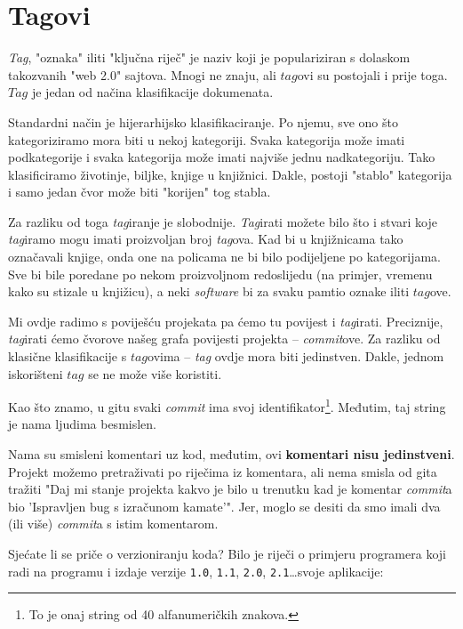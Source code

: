 \chapter*{Tagovi}

\emph{Tag}, "oznaka" iliti "ključna riječ" je naziv koji je populariziran s dolaskom takozvanih "web 2.0" sajtova. 
Mnogi ne znaju, ali $tag$ovi su postojali i prije toga. 
$Tag$ je jedan od načina klasifikacije dokumenata.

Standardni način je hijerarhijsko klasifikaciranje.
Po njemu, sve ono što kategoriziramo mora biti u nekoj kategoriji.
Svaka kategorija može imati podkategorije i svaka kategorija može imati najviše jednu nadkategoriju.
Tako klasificiramo životinje, biljke, knjige u knjižnici.
Dakle, postoji "stablo" kategorija i samo jedan čvor može biti "korijen" tog stabla.

Za razliku od toga \emph{tag}iranje je slobodnije.
\emph{Tag}irati možete bilo što i stvari koje \emph{tag}iramo mogu imati proizvoljan broj \emph{tag}ova.
Kad bi u knjižnicama tako označavali knjige, onda one na policama ne bi bilo podijeljene po kategorijama.
Sve bi bile poredane po nekom proizvoljnom redoslijedu (na primjer, vremenu kako su stizale u knjižicu), a neki \emph{software} bi za svaku pamtio oznake iliti $tag$ove.

Mi ovdje radimo s poviješću projekata pa ćemo tu povijest i \emph{tag}irati.
Preciznije, \emph{tag}irati ćemo čvorove našeg grafa povijesti projekta -- \emph{commit}ove.
Za razliku od klasične klasifikacije s $tag$ovima -- \emph{tag} ovdje mora biti jedinstven.
Dakle, jednom iskorišteni $tag$ se ne može više koristiti.

Kao što znamo, u gitu svaki \emph{commit} ima svoj identifikator\footnote{To je onaj string od 40 alfanumeričkih znakova.}. 
Međutim, taj string je nama ljudima besmislen.

Nama su smisleni komentari uz kod, međutim, ovi \textbf{komentari nisu jedinstveni}.
Projekt možemo pretraživati po riječima iz komentara, ali nema smisla od gita tražiti "Daj mi stanje projekta kakvo je bilo u trenutku kad je komentar \emph{commit}a bio 'Ispravljen bug s izračunom kamate'".
Jer, moglo se desiti da smo imali dva (ili više) \emph{commit}a s istim komentarom.

Sjećate li se priče o verzioniranju koda?
Bilo je riječi o primjeru programera koji radi na programu i izdaje verzije \verb+1.0+, \verb+1.1+, \verb+2.0+, \verb+2.1+\dots svoje aplikacije:

